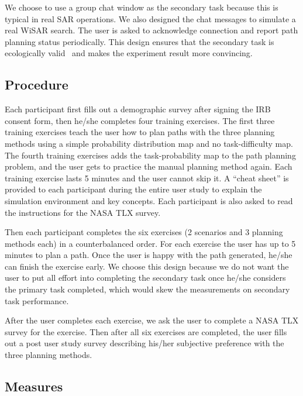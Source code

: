 \documentclass[lettersize, apacite, twoside, HRI]{apa_HRI}
\begin{document}
We choose to use a group chat window as the secondary task because this is typical in real SAR operations. We also designed the chat messages to simulate a real WiSAR search. The user is asked to acknowledge connection and report path planning status periodically. This design ensures that the secondary task is ecologically valid~\cite{Vicente1997Should,Rasmussen1994Cognitive} and makes the experiment result more convincing.

\subsection{Procedure}

Each participant first fills out a demographic survey after signing the IRB consent form, then he/she completes four training exercises. The first three training exercises teach the user how to plan paths with the three planning methods using a simple probability distribution map and no task-difficulty map. The fourth training exercises adds the task-probability map to the path planning problem, and the user gets to practice the manual planning method again. Each training exercise lasts 5 minutes and the user cannot skip it. A ``cheat sheet'' is provided to each participant during the entire user study to explain the simulation environment and key concepts. Each participant is also asked to read the instructions for the NASA TLX survey.

Then each participant completes the six exercises (2 scenarios and 3 planning methods each) in a counterbalanced order. For each exercise the user has up to 5 minutes to plan a path. Once the user is happy with the path generated, he/she can finish the exercise early. We choose this design because we do not want the user to put all effort into completing the secondary task once he/she considers the primary task completed, which would skew the measurements on secondary task performance.

After the user completes each exercise, we ask the user to complete a NASA TLX survey for the exercise. Then after all six exercises are completed, the user fills out a post user study survey describing his/her subjective preference with the three planning methods.

\subsection{Measures}
\end{document}
